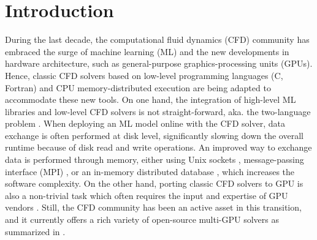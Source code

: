 \documentclass[10pt,a4paper]{article}
\begin{document}
\section{Introduction}
During the last decade, the computational fluid dynamics (CFD) community has embraced the surge of machine learning (ML) and the new developments in hardware architecture, such as general-purpose graphics-processing units (GPUs). Hence, classic CFD solvers based on low-level programming languages (C, Fortran) and CPU memory-distributed execution are being adapted to accommodate these new tools. On one hand, the integration of high-level ML libraries and low-level CFD solvers is not straight-forward, aka. the two-language problem \citep{Churavy2022}. When deploying an ML model online with the CFD solver, data exchange is often performed at disk level, significantly slowing down the overall runtime because of disk read and write operations. An improved way to exchange data is performed through memory, either using Unix sockets \citep{Rabault2019, Font2021}, message-passing interface (MPI) \citep{Guastoni2023}, or an in-memory distributed database \citep{Kurz2022,Font2024,Font2025}, which increases the software complexity. On the other hand, porting classic CFD solvers to GPU is also a non-trivial task which often requires the input and expertise of GPU vendors \citep{Romero2022}. Still, the CFD community has been an active asset in this transition, and it currently offers a rich variety of open-source multi-GPU solvers as summarized in .
\end{document}

